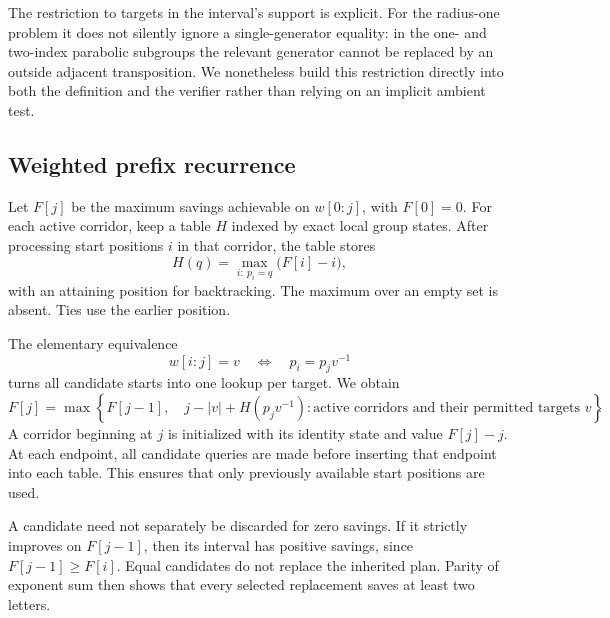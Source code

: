 \documentclass[11pt]{article}
\theoremstyle{definition}
\theoremstyle{remark}
\begin{document}
The restriction to targets in the interval's support is explicit. For the
radius-one problem it does not silently ignore a single-generator equality:
in the one- and two-index parabolic subgroups the relevant generator cannot
be replaced by an outside adjacent transposition. We nonetheless build this
restriction directly into both the definition and the verifier rather than
relying on an implicit ambient test.

\subsection{Weighted prefix recurrence}
Let $F[j]$ be the maximum savings achievable on $w[0:j]$, with $F[0]=0$.
For each active corridor, keep a table $H$ indexed by exact local group
states. After processing start positions $i$ in that corridor, the table
stores
\begin{equation}\label{eq:table}
 H(q)=\max_{i:\ p_i=q}\bigl(F[i]-i\bigr),
\end{equation}
with an attaining position for backtracking. The maximum over an empty set
is absent. Ties use the earlier position.

The elementary equivalence
\begin{equation}\label{eq:prefixidentity}
 w[i:j]=v\quad\Longleftrightarrow\quad p_i=p_jv^{-1}
\end{equation}
turns all candidate starts into one lookup per target. We obtain
\begin{equation}\label{eq:dp}
 F[j]=\max\left\{F[j-1],\quad
   j-|v|+H(p_jv^{-1}):
   \text{active corridors and their permitted targets }v\right\}.
\end{equation}
A corridor beginning at $j$ is initialized with its identity state and
value $F[j]-j$. At each endpoint, all candidate queries are made before
inserting that endpoint into each table. This ensures that only previously
available start positions are used.

A candidate need not separately be discarded for zero savings. If it
strictly improves on $F[j-1]$, then its interval has positive savings,
since $F[j-1]\ge F[i]$. Equal candidates do not replace the inherited plan.
Parity of exponent sum then shows that every selected replacement saves
at least two letters.
\end{document}
